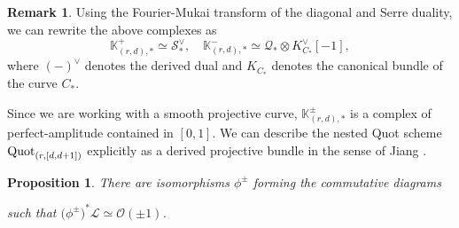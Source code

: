 \documentclass[10pt]{amsart}
\newcommand{\BK}{\mathbb{K}}
\newcommand{\BP}{\mathbb{P}}
\newcommand{\CO}{\mathcal{O}}
\newcommand{\CS}{\mathcal{S}}
\newcommand{\CQ}{\mathcal{Q}}
\newcommand{\CL}{\mathcal{L}}
\newcommand{\Quot}{\textnormal{Quot}}
\newcommand{\+}{{}^+}
\newtheorem {proposition}[theorem]{Proposition}
\theoremstyle{definition}
\theoremstyle {definition}
\newtheorem{remark}[theorem]{Remark}
\theoremstyle {definition}
\begin{document}
\begin{remark}\label{rem: explicit K complex}
Using the Fourier-Mukai transform of the diagonal and Serre duality, we can rewrite the above complexes as
$$\BK^+_{(r,d),*}\simeq \CS_*^\vee,\quad \BK^-_{(r,d),*}\simeq \CQ_*\otimes K_{C_*}^\vee[-1],
$$
where $(-)^\vee$ denotes the derived dual and $K_{C_*}$ denotes the canonical bundle of the curve $C_*$. 
\end{remark}

Since we are working with a smooth projective curve, $\BK^{\pm}_{(r,d),*}$ is a complex of perfect-amplitude contained in $[0,1]$. We can describe the nested Quot scheme $\Quot_{(r,[d,d+1])}$ explicitly as a derived projective bundle in the sense of Jiang \cite{Jiang}. 





\begin{proposition}\label{prop: virtual projective bundle}
    There are isomorphisms $\phi^{\pm}$ forming the commutative diagrams
    \begin{center}
    \end{center}
    such that $\big(\phi^{\pm}\big)^*\CL\simeq \CO(\pm 1)$.
\end{proposition}
\end{document}
